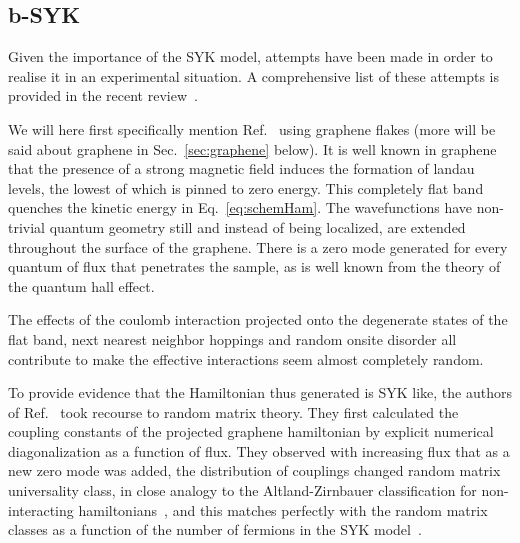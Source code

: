 \subsection{b-SYK}
Given the importance of the SYK model, attempts have been made in order to realise it in an experimental situation. A comprehensive list of these attempts is provided in the recent review~\cite{chowdhury_sachdev-ye-kitaev_2021}. 

\par 
We will here first specifically mention Ref.~\cite{Chen2018} using graphene flakes (more will be said about graphene in Sec.~\ref{sec:graphene} below). It is well known in graphene that the presence of a strong magnetic field induces the formation of landau levels, the lowest of which is pinned to zero energy. This completely flat band quenches the kinetic energy in Eq.~\ref{eq:schemHam}. The wavefunctions have non-trivial quantum geometry still and instead of being localized, are extended throughout the surface of the graphene. There is a zero mode generated for every quantum of flux that penetrates the sample, as is well known from the theory of the quantum hall effect. 

\par
The effects of the coulomb interaction projected onto the degenerate states of the flat band, next nearest neighbor hoppings and random onsite disorder all contribute to make the effective interactions seem almost completely random. 

\par
To provide evidence that the Hamiltonian thus generated is SYK like, the authors of  Ref.~\cite{Chen2018} took recourse to random matrix theory. They first calculated the coupling constants of the projected graphene hamiltonian by explicit numerical diagonalization as a function of flux. They observed with increasing flux that as a new zero mode was added, the distribution of couplings changed random matrix universality class, in close analogy to the Altland-Zirnbauer classification for non-interacting hamiltonians~\cite{altland1997nonstandard,fidkowski2010effects,fidkowski2011topological}, and this matches perfectly with the random matrix classes as a function of the number of fermions in the SYK model~\cite{garcia2016spectral,behrends2019tenfold,you2017sachdev}. 

